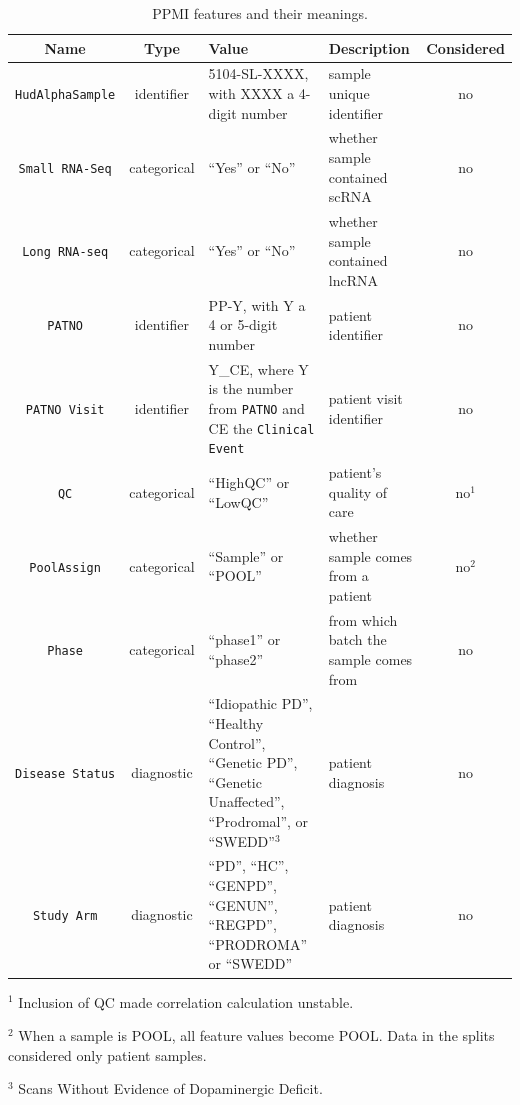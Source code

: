  \begin{table}[!ht]
    \centering 
    \begin{threeparttable}
    \caption{PPMI features and their meanings.}
    \label{tab:features_ppmi}
    \begin{tabular}{c | c p{3.5cm} p{3.5cm} c}
        \toprule
        Name & Type & Value & Description & Considered \\ 
        \midrule
        \texttt{HudAlphaSample} 
            & identifier & 5104-SL-XXXX, with XXXX a 4-digit number & sample unique identifier & no \\ 
        \texttt{Small RNA-Seq} 
            & categorical & ``Yes'' or ``No'' & whether sample contained scRNA & no \\ 
        \texttt{Long RNA-seq} 
            & categorical & ``Yes'' or ``No'' & whether sample contained lncRNA & no \\ 
        \texttt{PATNO} 
            & identifier & PP-Y, with Y a 4 or 5-digit number & patient identifier & no \\ 
        \texttt{PATNO Visit} 
            & identifier & Y\_CE, where Y is the number from \texttt{PATNO} 
              and CE the \texttt{Clinical Event} 
            & patient visit identifier & no \\ 
        \texttt{QC} 
            & categorical & ``HighQC'' or ``LowQC'' & patient's quality of care & no$^1$ \\ 
        \texttt{PoolAssign} 
            & categorical & ``Sample'' or ``POOL'' & whether sample comes from a patient & no$^2$ \\ 
        \texttt{Phase} 
            & categorical & ``phase1'' or ``phase2'' & from which batch the sample comes from & no \\ 
        \texttt{Disease Status} 
            & diagnostic 
            & ``Idiopathic PD'', ``Healthy Control'', ``Genetic PD'', 
            ``Genetic Unaffected'', ``Prodromal'', or ``SWEDD''$^3$
            & patient diagnosis & no \\ 
        \texttt{Study Arm} 
            & diagnostic 
            & ``PD'', ``HC'', ``GENPD'',  ``GENUN'', 
              ``REGPD'', ``PRODROMA'' or ``SWEDD'' 
            & patient diagnosis & no \\ 
        \bottomrule 
    \end{tabular}
    \begin{tablenotes}
        \item $^1$ Inclusion of QC made correlation calculation unstable.
        \item $^2$ 
            When a sample is POOL, all feature values become POOL.
            Data in the splits considered only patient samples.
        \item $^3$ Scans Without Evidence of Dopaminergic Deficit.
    \end{tablenotes}   
    \end{threeparttable}
\end{table}


